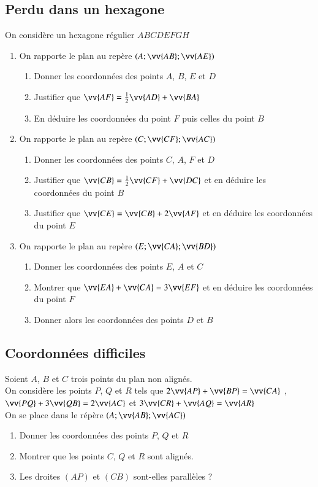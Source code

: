 \documentclass[oneside,12pt]{article}          %
\begin{document}
\subsection{Perdu dans un hexagone}
On considère un hexagone régulier $ABCDEFGH$
\begin{enumerate}
    \item On rapporte le plan au repère $(A;\vv{AB};\vv{AE})$
    \begin{enumerate}
        \item Donner les coordonnées des points $A$, $B$, $E$ et $D$
        \item Justifier que $\vv{AF}=\frac{1}{2}\vv{AD}+\vv{BA}$
        \item En déduire les coordonnées du point $F$ puis celles du point $B$
    \end{enumerate}
    \item On rapporte le plan au repère $(C;\vv{CF};\vv{AC})$
    \begin{enumerate}
        \item Donner les coordonnées des points $C$, $A$, $F$ et $D$
        \item Justifier que $\vv{CB}=\frac{1}{2}\vv{CF}+\vv{DC}$ et en déduire les coordonnées du point $B$
        \item Justifier que $\vv{CE}=\vv{CB}+2\vv{AF}$ et en déduire les coordonnées du point $E$
    \end{enumerate}
    \item On rapporte le plan au repère $(E;\vv{CA};\vv{BD})$
    \begin{enumerate}
        \item Donner les coordonnées des points $E$, $A$ et $C$
        \item Montrer que $\vv{EA}+\vv{CA}=3\vv{EF}$ et en déduire les coordonnées du point $F$
        \item Donner alors les coordonnées des points $D$ et $B$
    \end{enumerate}
\end{enumerate}



\subsection{Coordonnées difficiles}
Soient $A$, $B$ et $C$ trois points du plan non alignés.\\
On considère les points $P$, $Q$ et $R$ tels que $2\vv{AP}+\vv{BP}=\vv{CA}$ , \quad $\vv{PQ}+3\vv{QB}=2\vv{AC}$ et $3\vv{CR}+\vv{AQ}=\vv{AR}$\\
On se place dans le répère $(A;\vv{AB};\vv{AC})$
\begin{enumerate}
    \item Donner les coordonnées des points $P$, $Q$ et $R$
    \item Montrer que les points $C$, $Q$ et $R$ sont alignés.
    \item Les droites $(AP)$ et $(CB)$ sont-elles parallèles ?
\end{enumerate}
\end{document}
